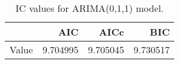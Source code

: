 \begin{table}[ht]
\centering
\begin{tabular}{rrrr}
  \hline
 & AIC & AICc & BIC \\ 
  \hline
Value & 9.704995 & 9.705045 & 9.730517 \\ 
   \hline
\end{tabular}
\caption{IC values for ARIMA(0,1,1) model.}
\end{table}